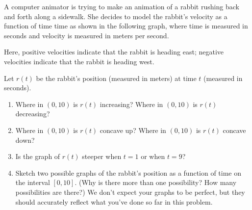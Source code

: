 \documentclass{article}
\begin{document}
\begin{enumerate}
  A computer animator is trying to make an animation of a rabbit rushing back and forth along a sidewalk. She decides to model the rabbit's velocity as a function of time time as shown in the following graph, where time is measured in seconds and velocity is measured in meters per second.
  \begin{center}
  \end{center}
  Here, positive velocities indicate that the rabbit is heading east; negative velocities indicate that the rabbit is heading west.

  Let $r(t)$ be the rabbit's position (measured in meters) at time $t$ (measured in seconds).

  \begin{enumerate}
  \item
    \begin{problem}[\vfill]
      Where in $(0, 10)$ is $r(t)$ increasing? Where in $(0, 10)$ is $r(t)$ decreasing?
    \end{problem}

  \item
    \begin{problem}[\vfill]
      Where in $(0, 10)$ is $r(t)$ concave up? Where in $(0, 10)$ is $r(t)$ concave down? 
    \end{problem}

  \item
    \begin{problem}[\nstretch{0.5}]
      Is the graph of $r(t)$ steeper when $t = 1$ or when $t = 9$?
    \end{problem}

  \item \label{rabbit-position}
    \begin{problem}[\stretch{3}]
      Sketch two possible graphs of the rabbit's position as a function of time on the interval $[0, 10]$. (Why is there more than one possibility? How many possibilities are there?) We don't expect your graphs to be perfect, but they should accurately reflect what you've done so far in this problem.
    \end{problem}


\end{enumerate}
\end{enumerate}
\end{document}
